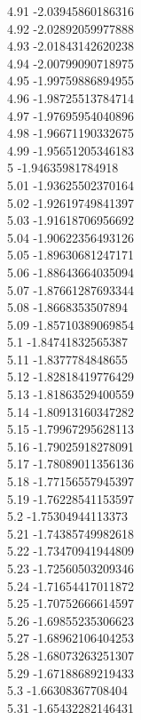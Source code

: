 {4.91	-2.03945860186316\\
4.92	-2.02892059977888\\
4.93	-2.01843142620238\\
4.94	-2.00799090718975\\
4.95	-1.99759886894955\\
4.96	-1.98725513784714\\
4.97	-1.97695954040896\\
4.98	-1.96671190332675\\
4.99	-1.95651205346183\\
5	-1.94635981784918\\
5.01	-1.93625502370164\\
5.02	-1.92619749841397\\
5.03	-1.91618706956692\\
5.04	-1.90622356493126\\
5.05	-1.89630681247171\\
5.06	-1.88643664035094\\
5.07	-1.87661287693344\\
5.08	-1.8668353507894\\
5.09	-1.85710389069854\\
5.1	-1.84741832565387\\
5.11	-1.8377784848655\\
5.12	-1.82818419776429\\
5.13	-1.81863529400559\\
5.14	-1.80913160347282\\
5.15	-1.79967295628113\\
5.16	-1.79025918278091\\
5.17	-1.78089011356136\\
5.18	-1.77156557945397\\
5.19	-1.76228541153597\\
5.2	-1.75304944113373\\
5.21	-1.74385749982618\\
5.22	-1.73470941944809\\
5.23	-1.72560503209346\\
5.24	-1.71654417011872\\
5.25	-1.70752666614597\\
5.26	-1.69855235306623\\
5.27	-1.68962106404253\\
5.28	-1.68073263251307\\
5.29	-1.67188689219433\\
5.3	-1.66308367708404\\
5.31	-1.65432282146431\\
}
